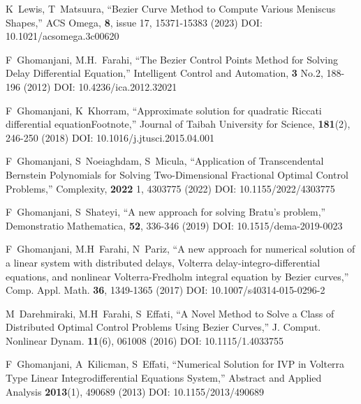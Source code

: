 \documentclass[12pt]{article}
\begin{document}
\appendix










\begin{thebibliography}{0}
	
	K~Lewis, T~Matsuura,
	``Bezier Curve Method to Compute Various Meniscus Shapes,''
	ACS Omega, \textbf{8}, issue 17, 15371-15383 (2023)
	DOI: 10.1021/acsomega.3c00620

	F~Ghomanjani, M.H.~Farahi,
	``The Bezier Control Points Method for Solving Delay Differential Equation,''
	Intelligent Control and Automation, \textbf{3} No.2, 188-196 (2012)
	DOI: 10.4236/ica.2012.32021 

	F~Ghomanjani, K~Khorram,
	``Approximate solution for quadratic Riccati differential equationFootnote,''
	Journal of Taibah University for Science, \textbf{181}(2), 246-250 (2018)
	DOI: 10.1016/j.jtusci.2015.04.001

	F~Ghomanjani, S~Noeiaghdam, S~Micula,
	``Application of Transcendental Bernstein Polynomials for Solving Two-Dimensional Fractional Optimal Control Problems,''
	Complexity, \textbf{2022} 1, 4303775 (2022)
	DOI: 10.1155/2022/4303775

	F~Ghomanjani, S~Shateyi,
	``A new approach for solving Bratu's problem,''
	Demonstratio Mathematica, \textbf{52}, 336-346 (2019)
	DOI: 10.1515/dema-2019-0023

	F~Ghomanjani, M.H~Farahi, N~Pariz,
	``A new approach for numerical solution of a linear system with distributed delays, Volterra delay-integro-differential equations, and nonlinear Volterra-Fredholm integral equation by Bezier curves,''
	Comp. Appl. Math. \textbf{36}, 1349-1365 (2017)
	DOI: 10.1007/s40314-015-0296-2

	M~Darehmiraki, M.H~Farahi, S~Effati,
	``A Novel Method to Solve a Class of Distributed Optimal Control Problems Using Bezier Curves,''
	J. Comput. Nonlinear Dynam. \textbf{11}(6), 061008 (2016)
	DOI: 10.1115/1.4033755

	F~Ghomanjani, A~Kilicman, S~Effati,
	``Numerical Solution for IVP in Volterra Type Linear Integrodifferential Equations System,''
	Abstract and Applied Analysis \textbf{2013}(1), 490689 (2013)
	DOI: 10.1155/2013/490689


\end{thebibliography}
\end{document}
